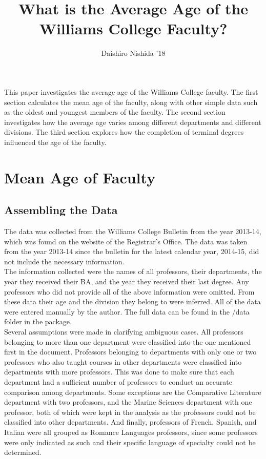 \documentclass{article}\usepackage[]{graphicx}\usepackage[]{color}
\begin{document}
\title{What is the Average Age of the Williams College Faculty?}
\author{Daishiro Nishida '18}
\maketitle

This paper investigates the average age of the Williams College faculty. The first section calculates the
mean age of the faculty, along with other simple data such as the oldest and youngest members of the faculty.
The second section investigates how the average age varies among different departments and different
divisions. The third section explores how the completion of terminal degrees influenced the age of the
faculty.\\

\section{Mean Age of Faculty}

\subsection{Assembling the Data}
The data was collected from the Williams College Bulletin from the year 2013-14, which was found on the
website of the Registrar's Office. The data was taken from the year 2013-14 since the bulletin for the
latest calendar year, 2014-15, did not include the necessary information.\\

The information collected were the names of all professors, their departments, the year they received their
BA, and the year they received their last degree. Any professors who did not provide all of the above
information were omitted. From these data their age and the division they belong to were inferred.
All of the data were entered manually by the author.
The full data can be found in the /data folder in the package.\\

Several assumptions were made in clarifying ambiguous cases. All professors belonging to more than one
department were classified into the one mentioned first in the document. Professors belonging to departments
with only one or two professors who also taught courses in other departments were classified into departments
with more professors. This was done to make sure that each department had a sufficient number of professors
to conduct an accurate comparison among departments. Some exceptions are the Comparative Literature department
with two professors, and the Marine Sciences department with one professor, both of which were kept in the analysis as the professors could not be classified into other departments. And finally, professors of French,
Spanish, and Italian were all grouped as Romance Languages professors, since some professors were only
indicated as such and their specific language of specialty could not be determined.
\end{document}
